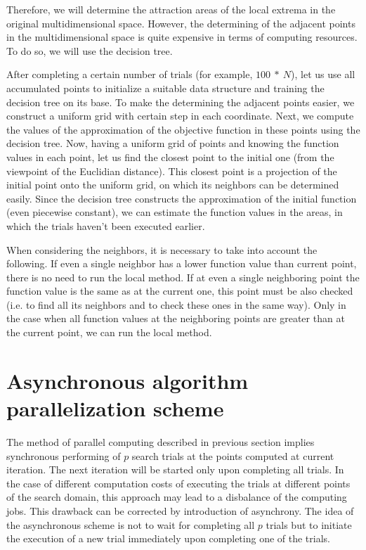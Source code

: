 \documentclass{svproc}
\begin{document}
Therefore, we will determine the attraction areas of the local extrema in the original multidimensional space. However, the determining of the adjacent points in the multidimensional space is quite expensive in terms of computing resources. To do so, we will use the decision tree. 

After completing a certain number of trials (for example, $100\ \ast\ N$), let us use all accumulated  points to initialize a suitable data structure and training the decision tree on its base. To make the  determining the adjacent points easier, we construct a uniform grid with certain step in each coordinate.  Next, we compute the values of the approximation of the objective function in these points  using the decision tree. Now, having a uniform grid of points and knowing the function values in each  point, let us find the closest point to the initial one (from the viewpoint of the Euclidian distance). This  closest point is a projection of the initial point onto the uniform grid, on which its neighbors can be  determined easily. Since the decision tree constructs the approximation of the initial function (even  piecewise constant), we can estimate the function values in the areas, in which the trials haven't been  executed earlier.

When considering the neighbors, it is necessary to take into account the following. If even a single  neighbor has a lower function value than current point, there is no need to run the local method. If at  even a single neighboring point the function value is the same as at the current one, this point must be also checked (i.e. to find all its neighbors and to check these ones in the same way). Only in the case when  all function values at the neighboring points are greater than at the current point, we can run the local  method.




\section{Asynchronous algorithm parallelization scheme}\label{SecASP}

The method of parallel computing described in  previous section implies synchronous  performing of $p$ search trials at the points computed at current iteration. The next iteration will be  started only upon completing all trials. In the case of different computation costs of executing the trials at different points of the search  domain, this approach may lead to a disbalance of the computing jobs.  This drawback can be corrected by introduction of asynchrony. The idea of the asynchronous scheme is not to wait for completing all $p$ trials but to initiate the  execution of a new trial immediately upon completing one of the trials. 
\end{document}
